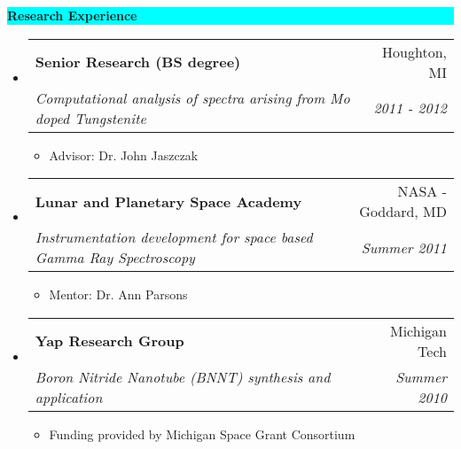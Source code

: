 \documentclass[letterpaper,10pt]{article}
\makeatletter
\newcommand{\resitem}[1]{\item #1 \vspace{-2pt}}
\newcommand{\resheading}[1]{{\large \colorbox{Cyan}{\begin{minipage}{\textwidth}{\textbf{#1 \vphantom{p\^{E}}}}\end{minipage}}}}
\newcommand{\ressubheading}[4]{
\begin{tabular*}{6.5in}{l@{\extracolsep{\fill}}r}
		\textbf{#1} & #2 \\
		\textit{#3} & \textit{#4} \\
\end{tabular*}\vspace{-6pt}}
\makeatother
\begin{document}

\resheading{Research Experience}
\begin{itemize}
\item%
	\ressubheading{Senior Research (BS degree)}{Houghton, MI}{Computational analysis of spectra arising from Mo doped Tungstenite}{2011 - 2012}
	{\footnotesize
	\begin{itemize}
		\resitem{Advisor: Dr. John Jaszczak}
	\end{itemize}
	}
\item%
	\ressubheading{Lunar and Planetary Space Academy}{NASA - Goddard, MD}{Instrumentation development for space based Gamma Ray Spectroscopy}{Summer 2011}
	{\footnotesize
	\begin{itemize}
		\resitem{Mentor: Dr. Ann Parsons}
	\end{itemize}
	}
\item%
	\ressubheading{Yap Research Group}{Michigan Tech}{Boron Nitride Nanotube (BNNT) synthesis and application}{Summer 2010}
	{\footnotesize
	\begin{itemize}
		\resitem{Funding provided by Michigan Space Grant Consortium}
	\end{itemize}
	}
\end{itemize}
\end{document}
